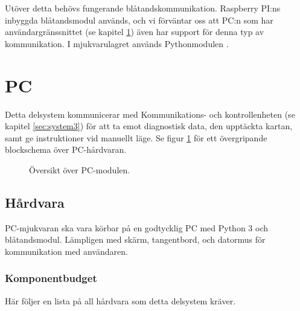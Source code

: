 \documentclass[a4paper,11pt]{article}
\begin{document}
Utöver detta behövs fungerande blåtandskommunikation. Raspberry PI:ns inbyggda blåtandsmodul används, och vi förväntar oss att PC:n som har användargränssnittet (se kapitel \ref{sec:system4}) även har support för denna typ av kommunikation. I mjukvarulagret används Pythonmodulen \cite{pybluez}.

\newpage
\section{PC} \label{sec:system4}
Detta delsystem kommunicerar med Kommunikations- och kontrollenheten (se kapitel \ref{sec:system3}) för att ta emot diagnostisk data, den upptäckta kartan, samt ge instruktioner vid manuellt läge. Se figur \ref{fig:unitPC} för ett övergripande blockschema över PC-hårdvaran.

\begin{figure}[h!]
    \caption{Översikt över PC-modulen.}
    \label{fig:unitPC}
\end{figure}
\subsection{Hårdvara}
PC-mjukvaran ska vara körbar på en godtycklig PC med Python 3 och blåtandsmodul. Lämpligen med skärm, tangentbord, och datormus för kommunikation med användaren.

\subsubsection{Komponentbudget}
Här följer en lista på all hårdvara som detta delsystem kräver.

\begin{center}
\begin{HardwareList}
\end{HardwareList}
\end{center}
\end{document}
